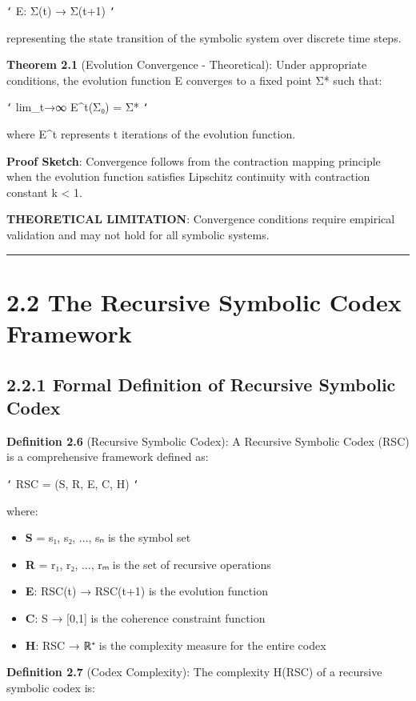 \texttt{`}
E: Σ(t) → Σ(t+1)
\texttt{`}

representing the state transition of the symbolic system over discrete time steps.

\textbf{Theorem 2.1} (Evolution Convergence - Theoretical): Under appropriate conditions, the evolution function E converges to a fixed point Σ* such that:

\texttt{`}
lim_{t→∞} E^t(Σ₀) = Σ*
\texttt{`}

where E^t represents t iterations of the evolution function.

\textbf{Proof Sketch}: Convergence follows from the contraction mapping principle when the evolution function satisfies Lipschitz continuity with contraction constant k < 1.

\textbf{THEORETICAL LIMITATION}: Convergence conditions require empirical validation and may not hold for all symbolic systems.

\hrule

\section{2.2 The Recursive Symbolic Codex Framework}

\subsection{2.2.1 Formal Definition of Recursive Symbolic Codex}

\textbf{Definition 2.6} (Recursive Symbolic Codex): A Recursive Symbolic Codex (RSC) is a comprehensive framework defined as:

\texttt{`}
RSC = (S, R, E, C, H)
\texttt{`}

where:
\begin{itemize}
\item \textbf{S} = {s₁, s₂, ..., sₙ} is the symbol set
\item \textbf{R} = {r₁, r₂, ..., rₘ} is the set of recursive operations
\item \textbf{E}: RSC(t) → RSC(t+1) is the evolution function
\item \textbf{C}: S → [0,1] is the coherence constraint function
\item \textbf{H}: RSC → ℝ⁺ is the complexity measure for the entire codex
\end{itemize}

\textbf{Definition 2.7} (Codex Complexity): The complexity H(RSC) of a recursive symbolic codex is:

